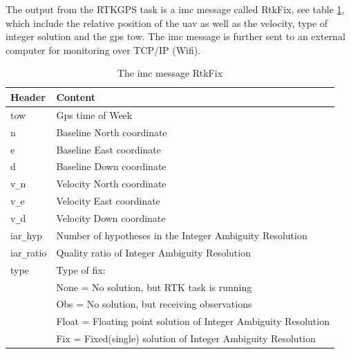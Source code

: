 The output from the RTKGPS task is a \gls{imc} message called RtkFix, see table \ref{Tb:RtkFix}, which include the relative position of the \gls{uav} as well as the velocity, type of integer solution and the \gls{gps} \acrfull{tow}. The \gls{imc} message is further sent to an external computer for monitoring over TCP/IP (Wifi).
\begin{table}[H]
\begin{center}
    \begin{tabular}{ | l | l |}
    \hline
    \textbf{Header} & \textbf{Content} \\ \hline
     tow & Gps time of Week  \\ \hline
     n & Baseline North coordinate \\ \hline
     e & Baseline East coordinate \\ \hline
     d & Baseline Down coordinate \\ \hline
     v\verb=_=n & Velocity North coordinate \\ \hline
     v\verb=_=e & Velocity East coordinate \\ \hline
     v\verb=_=d & Velocity Down coordinate \\ \hline
     iar\verb=_=hyp & Number of hypotheses in the Integer Ambiguity Resolution \\ \hline
     iar\verb=_=ratio & Quality ratio of Integer Ambiguity Resolution \\ \hline
     type & Type of fix: \\& None = No solution, but RTK task is running
     \\& Obs = No solution, but receiving observations
     \\& Float = Floating point solution of Integer Ambiguity Resolution
     \\& Fix = Fixed(single) solution of Integer Ambiguity Resolution \\ \hline
    \end{tabular}
\end{center}
\caption{The \gls{imc} message RtkFix }
\label{Tb:RtkFix}
\end{table}

